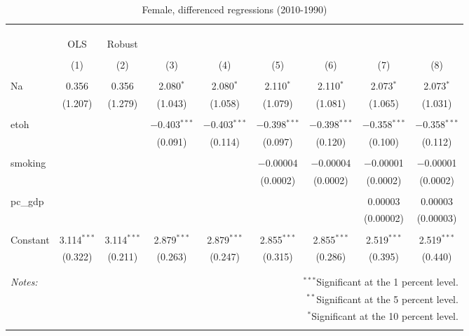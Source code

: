 \documentclass[11pt]{article}\usepackage[]{graphicx}\usepackage[]{color}
\begin{document}
\begin{table}[!htbp] \centering 
  \caption{Female, differenced regressions (2010-1990)} 
  \label{tab:flm} 
\begin{tabular}{@{\extracolsep{5pt}}lcccccccc} 
\\[-1.8ex]\hline 
\hline \\[-1.8ex] 
\\[-1.8ex] & \multicolumn{8}{c}{ } \\ 
 & OLS & Robust &  &  &  &  &  &  \\ 
\\[-1.8ex] & (1) & (2) & (3) & (4) & (5) & (6) & (7) & (8)\\ 
\hline \\[-1.8ex] 
 Na & 0.356 & 0.356 & 2.080$^{*}$ & 2.080$^{*}$ & 2.110$^{*}$ & 2.110$^{*}$ & 2.073$^{*}$ & 2.073$^{*}$ \\ 
  & (1.207) & (1.279) & (1.043) & (1.058) & (1.079) & (1.081) & (1.065) & (1.031) \\ 
  & & & & & & & & \\ 
 etoh &  &  & $-$0.403$^{***}$ & $-$0.403$^{***}$ & $-$0.398$^{***}$ & $-$0.398$^{***}$ & $-$0.358$^{***}$ & $-$0.358$^{***}$ \\ 
  &  &  & (0.091) & (0.114) & (0.097) & (0.120) & (0.100) & (0.112) \\ 
  & & & & & & & & \\ 
 smoking &  &  &  &  & $-$0.00004 & $-$0.00004 & $-$0.00001 & $-$0.00001 \\ 
  &  &  &  &  & (0.0002) & (0.0002) & (0.0002) & (0.0002) \\ 
  & & & & & & & & \\ 
 pc\_gdp &  &  &  &  &  &  & 0.00003 & 0.00003 \\ 
  &  &  &  &  &  &  & (0.00002) & (0.00003) \\ 
  & & & & & & & & \\ 
 Constant & 3.114$^{***}$ & 3.114$^{***}$ & 2.879$^{***}$ & 2.879$^{***}$ & 2.855$^{***}$ & 2.855$^{***}$ & 2.519$^{***}$ & 2.519$^{***}$ \\ 
  & (0.322) & (0.211) & (0.263) & (0.247) & (0.315) & (0.286) & (0.395) & (0.440) \\ 
  & & & & & & & & \\ 
\hline 
\hline \\[-1.8ex] 
\textit{Notes:} & \multicolumn{8}{r}{$^{***}$Significant at the 1 percent level.} \\ 
 & \multicolumn{8}{r}{$^{**}$Significant at the 5 percent level.} \\ 
 & \multicolumn{8}{r}{$^{*}$Significant at the 10 percent level.} \\ 
 & \multicolumn{8}{r}{} \\ 
\end{tabular} 
\end{table} 
\end{document}

